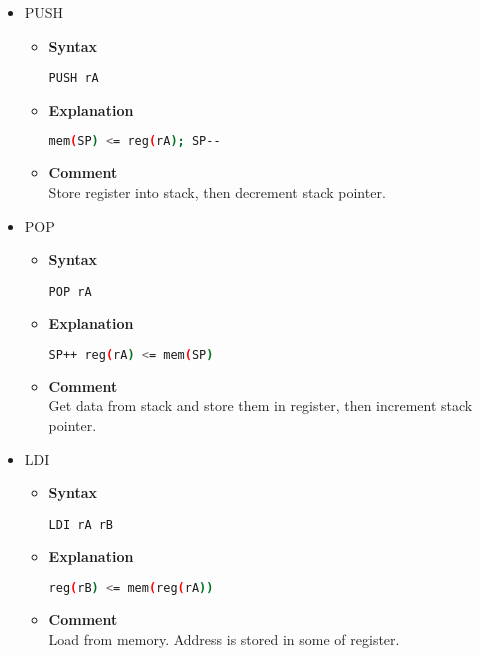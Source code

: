 \begin{itemize}
    \item PUSH
    \begin{itemize}
        \item \textbf{Syntax}
        \begin{lstlisting}[language={[markII]Assembler}, frame=single]
    PUSH rA
        \end{lstlisting}
        \item \textbf{Explanation}
        \begin{lstlisting}[language=bash, frame=single]
    mem(SP) <= reg(rA); SP--
        \end{lstlisting}
        \item \textbf{Comment} \\
    Store register into stack, then decrement stack pointer.
    \end{itemize}

    \item POP
    \begin{itemize}
        \item \textbf{Syntax}
        \begin{lstlisting}[language={[markII]Assembler}, frame=single]
    POP rA
        \end{lstlisting}
        \item \textbf{Explanation}
        \begin{lstlisting}[language=bash, frame=single]
    SP++ reg(rA) <= mem(SP)
        \end{lstlisting}
        \item \textbf{Comment} \\
    Get data from stack and store them in register, then increment stack pointer.
    \end{itemize}

    \item LDI
    \begin{itemize}
        \item \textbf{Syntax}
        \begin{lstlisting}[language={[markII]Assembler}, frame=single]
    LDI rA rB
        \end{lstlisting}
        \item \textbf{Explanation}
        \begin{lstlisting}[language=bash, frame=single]
    reg(rB) <= mem(reg(rA))
        \end{lstlisting}
        \item \textbf{Comment} \\
    Load from memory. Address is stored in some of register.
    \end{itemize}


\end{itemize}
